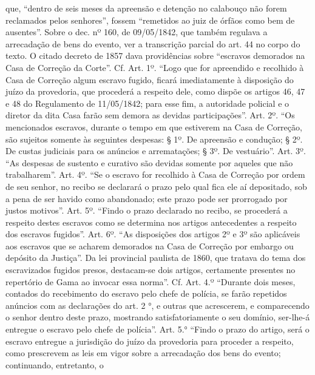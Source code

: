 {  que, ``dentro de seis meses da apreensão e detenção no calabouço não
  forem reclamados pelos senhores'', fossem ``remetidos ao juiz de órfãos
  como bem de ausentes''.
  Sobre o dec. nº 160, de 09/05/1842, que também
  regulava a arrecadação de bens do evento, ver a transcrição parcial do
  art. 44 no corpo do texto. O citado decreto de 1857 dava providências
  sobre ``escravos demorados na Casa de Correção da Corte''. Cf. Art.
  1º. ``Logo que for apreendido e recolhido à Casa de Correção algum
  escravo fugido, ficará imediatamente à disposição do juízo da
  provedoria, que procederá a respeito dele, como dispõe os artigos 46,
  47 e 48 do Regulamento de 11/05/1842; para esse fim, a autoridade
  policial e o diretor da dita Casa farão sem demora as devidas
  participações''. Art. 2º. ``Os mencionados escravos, durante o tempo em
  que estiverem na Casa de Correção, são sujeitos somente às seguintes
  despesas: § 1º. De apreensão e condução; § 2º. De custas judiciais
  para os anúncios e arrematações; § 3º. De vestuário''. Art. 3º. ``As
  despesas de sustento e curativo são devidas somente por aqueles que
  não trabalharem''. Art. 4º. ``Se o escravo for recolhido à Casa de
  Correção por ordem de seu senhor, no recibo se declarará o prazo pelo
  qual fica ele aí depositado, sob a pena de ser havido como abandonado;
  este prazo pode ser prorrogado por justos motivos''. Art. 5º. ``Findo o
  prazo declarado no recibo, se procederá a respeito destes escravos
  como se determina nos artigos antecedentes a respeito dos escravos
  fugidos''. Art. 6º. ``As disposições dos artigos 2º e 3º são aplicáveis
  aos escravos que se acharem demorados na Casa de Correção por embargo
  ou depósito da Justiça''. Da lei provincial paulista de 1860, que
  tratava do tema dos escravizados fugidos presos, destacam-se dois
  artigos, certamente presentes no repertório de Gama ao invocar essa
  norma''. Cf. Art. 4.º ``Durante dois meses, contados do recebimento do
  escravo pelo chefe de polícia, se farão repetidos anúncios com as
  declarações do art. 2 °, e outras que acrescerem, e comparecendo o
  senhor dentro deste prazo, mostrando satisfatoriamente o seu domínio,
  ser-lhe-á entregue o escravo pelo chefe de polícia''. Art. 5.° ``Findo o
  prazo do artigo, será o escravo entregue a jurisdição do juízo da
  provedoria para proceder a respeito, como prescrevem as leis em vigor
  sobre a arrecadação dos bens do evento; continuando, entretanto, o
}
